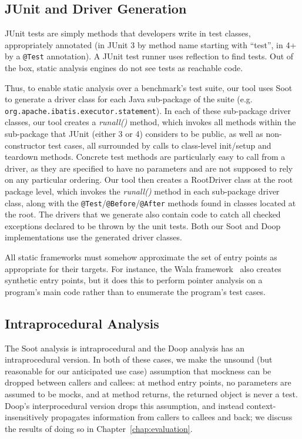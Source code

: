 \subsection{JUnit and Driver Generation}

JUnit tests are simply methods that developers write in test classes, appropriately annotated (in JUnit 3 by method name starting with ``test'', in 4+ by a \texttt{@Test} annotation). A JUnit test runner uses reflection to find tests. Out of the box, static analysis engines do not see tests as reachable code.


Thus, to enable static analysis over a benchmark's test suite, our tool uses Soot to generate a driver class for each Java sub-package of the suite (e.g. \\ \texttt{org.apache.ibatis.executor.statement}). In each of these sub-package driver classes, our tool creates a \textit{runall()} method, which invokes all methods within the sub-package that JUnit (either 3 or 4) considers to be public, as well as non-constructor test cases, all surrounded by calls to class-level init/setup and teardown methods. Concrete test methods are particularly easy to call from a driver, as they are specified to have no parameters and are not supposed to rely on any particular ordering. 
Our tool then creates a RootDriver class at the root package level, which invokes the \textit{runall()} method in each sub-package driver class, along with the \texttt{@Test}/\texttt{@Before}/\texttt{@After} methods found in classes located at the root. The drivers that we generate also contain code to catch all checked exceptions declared to be thrown by the unit tests. Both our Soot and Doop implementations use the generated driver classes.

All static frameworks must somehow approximate the set of entry points as appropriate for their targets. For instance, the Wala framework~\cite{wala19:_t} also creates synthetic entry points, but it does this to perform pointer analysis on a program's main code rather than to enumerate the program's test cases.

\subsection{Intraprocedural Analysis} 

The Soot analysis is intraprocedural and the Doop analysis has an intraprocedural version. In both of these cases, we make the unsound (but reasonable for our anticipated use case) assumption that mockness can be dropped between callers and callees: at method entry points, no parameters are assumed to be mocks, and at method returns, the returned object is never a test. Doop's interprocedural version drops this assumption, and instead context-insensitively propagates information from callers to callees and back; we discuss the results of doing so in Chapter~\ref{chap:evaluation}.

